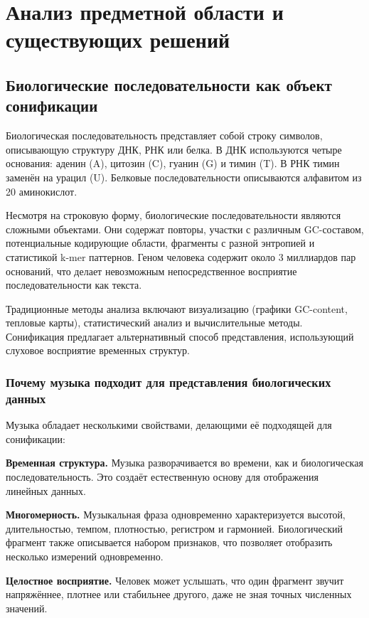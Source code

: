 \chapter{Анализ предметной области и существующих решений}

\section{Биологические последовательности как объект сонификации}

Биологическая последовательность представляет собой строку символов, описывающую структуру ДНК, РНК или белка. В ДНК используются четыре основания: аденин (A), цитозин (C), гуанин (G) и тимин (T). В РНК тимин заменён на урацил (U). Белковые последовательности описываются алфавитом из 20 аминокислот.

Несмотря на строковую форму, биологические последовательности являются сложными объектами. Они содержат повторы, участки с различным GC-составом, потенциальные кодирующие области, фрагменты с разной энтропией и статистикой k-mer паттернов. Геном человека содержит около 3 миллиардов пар оснований, что делает невозможным непосредственное восприятие последовательности как текста.

Традиционные методы анализа включают визуализацию (графики GC-content, тепловые карты), статистический анализ и вычислительные методы. Сонификация предлагает альтернативный способ представления, использующий слуховое восприятие временных структур.

\subsection{Почему музыка подходит для представления биологических данных}

Музыка обладает несколькими свойствами, делающими её подходящей для сонификации:

\textbf{Временная структура.} Музыка разворачивается во времени, как и биологическая последовательность. Это создаёт естественную основу для отображения линейных данных.

\textbf{Многомерность.} Музыкальная фраза одновременно характеризуется высотой, длительностью, темпом, плотностью, регистром и гармонией. Биологический фрагмент также описывается набором признаков, что позволяет отобразить несколько измерений одновременно.

\textbf{Целостное восприятие.} Человек может услышать, что один фрагмент звучит напряжённее, плотнее или стабильнее другого, даже не зная точных численных значений.

